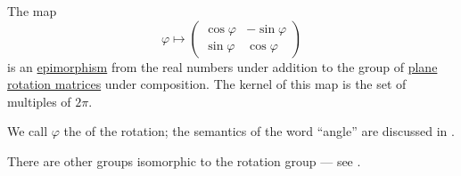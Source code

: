 \begin{proposition}\label{thm:plane_rotation_matrix_angle}
  The map
  \begin{equation}\label{eq:thm:plane_rotation_matrix_angle}
    \varphi
    \mapsto
    \begin{pmatrix}
      \cos \varphi & -\sin \varphi \\
      \sin \varphi & \cos \varphi
    \end{pmatrix}
  \end{equation}
  is an \hyperref[def:morphism_invertibility/right_cancellative]{epimorphism} from the real numbers under addition to the group of \hyperref[thm:plane_rotation_matrix]{plane rotation matrices} under composition. The kernel of this map is the set of multiples of \( 2\pi \).

  We call \( \varphi \) the  of the rotation; the semantics of the word \enquote{angle} are discussed in .

  There are other groups isomorphic to the rotation group --- see .
\end{proposition}
